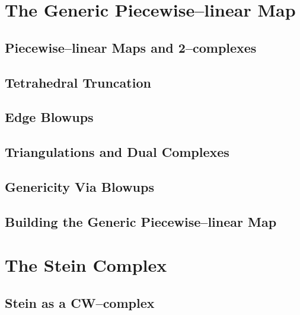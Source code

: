 \label{cha:alg1}



\section{The Generic Piecewise--linear Map}
\label{sec:proj}


	\subsection{Piecewise--linear Maps and 2--complexes}
	\label{sub:2complex}
	
	
	\subsection{Tetrahedral Truncation}
	\label{sub:truncttet}
	
	
	\subsection{Edge Blowups}
	\label{sub:edgeblowup}
	
	
	\subsection{Triangulations and Dual Complexes}
	\label{sub:tridual}
	
	
	\subsection{Genericity Via Blowups}
	\label{sub:genericity}
	
	
	\subsection{Building the Generic Piecewise--linear Map}
	\label{sub:genericplmap}
	

\section{The Stein Complex}
\label{sec:stein}


	\subsection{Stein as a CW--complex}
	\label{sub:zero}
	

